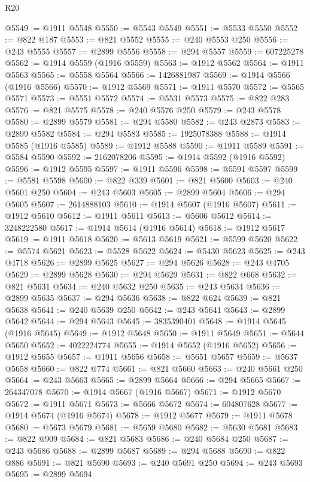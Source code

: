 \begin{lexlean}{R20}
\begin{coremodule}
{@5549 := @1911 @5548
@5550 := @5543 @5549
@5551 := @5533 @5550
@5552 := @822 @187
@5553 := @821 @5552
@5555 := @240 @5553 @250
@5556 := @243 @5555
@5557 := @2899 @5556
@5558 := @294 @5557
@5559 := 607225278
@5562 := @1914 @5559 (@1916 @5559)
@5563 := @1912 @5562
@5564 := @1911 @5563
@5565 := @5558 @5564
@5566 := 1426881987
@5569 := @1914 @5566 (@1916 @5566)
@5570 := @1912 @5569
@5571 := @1911 @5570
@5572 := @5565 @5571
@5573 := @5551 @5572
@5574 := @5531 @5573
@5575 := @822 @283
@5576 := @821 @5575
@5578 := @240 @5576 @250
@5579 := @243 @5578
@5580 := @2899 @5579
@5581 := @294 @5580
@5582 := @243 @2873
@5583 := @2899 @5582
@5584 := @294 @5583
@5585 := 1925078388
@5588 := @1914 @5585 (@1916 @5585)
@5589 := @1912 @5588
@5590 := @1911 @5589
@5591 := @5584 @5590
@5592 := 2162078206
@5595 := @1914 @5592 (@1916 @5592)
@5596 := @1912 @5595
@5597 := @1911 @5596
@5598 := @5591 @5597
@5599 := @5581 @5598
@5600 := @822 @339
@5601 := @821 @5600
@5603 := @240 @5601 @250
@5604 := @243 @5603
@5605 := @2899 @5604
@5606 := @294 @5605
@5607 := 2614888103
@5610 := @1914 @5607 (@1916 @5607)
@5611 := @1912 @5610
@5612 := @1911 @5611
@5613 := @5606 @5612
@5614 := 3248222580
@5617 := @1914 @5614 (@1916 @5614)
@5618 := @1912 @5617
@5619 := @1911 @5618
@5620 := @5613 @5619
@5621 := @5599 @5620
@5622 := @5574 @5621
@5623 := @5528 @5622
@5624 := @5430 @5623
@5625 := @243 @4718
@5626 := @2899 @5625
@5627 := @294 @5626
@5628 := @243 @4705
@5629 := @2899 @5628
@5630 := @294 @5629
@5631 := @822 @668
@5632 := @821 @5631
@5634 := @240 @5632 @250
@5635 := @243 @5634
@5636 := @2899 @5635
@5637 := @294 @5636
@5638 := @822 @624
@5639 := @821 @5638
@5641 := @240 @5639 @250
@5642 := @243 @5641
@5643 := @2899 @5642
@5644 := @294 @5643
@5645 := 3835390401
@5648 := @1914 @5645 (@1916 @5645)
@5649 := @1912 @5648
@5650 := @1911 @5649
@5651 := @5644 @5650
@5652 := 4022224774
@5655 := @1914 @5652 (@1916 @5652)
@5656 := @1912 @5655
@5657 := @1911 @5656
@5658 := @5651 @5657
@5659 := @5637 @5658
@5660 := @822 @774
@5661 := @821 @5660
@5663 := @240 @5661 @250
@5664 := @243 @5663
@5665 := @2899 @5664
@5666 := @294 @5665
@5667 := 264347078
@5670 := @1914 @5667 (@1916 @5667)
@5671 := @1912 @5670
@5672 := @1911 @5671
@5673 := @5666 @5672
@5674 := 604807628
@5677 := @1914 @5674 (@1916 @5674)
@5678 := @1912 @5677
@5679 := @1911 @5678
@5680 := @5673 @5679
@5681 := @5659 @5680
@5682 := @5630 @5681
@5683 := @822 @909
@5684 := @821 @5683
@5686 := @240 @5684 @250
@5687 := @243 @5686
@5688 := @2899 @5687
@5689 := @294 @5688
@5690 := @822 @886
@5691 := @821 @5690
@5693 := @240 @5691 @250
@5694 := @243 @5693
@5695 := @2899 @5694
}
\end{coremodule}
\end{lexlean}
